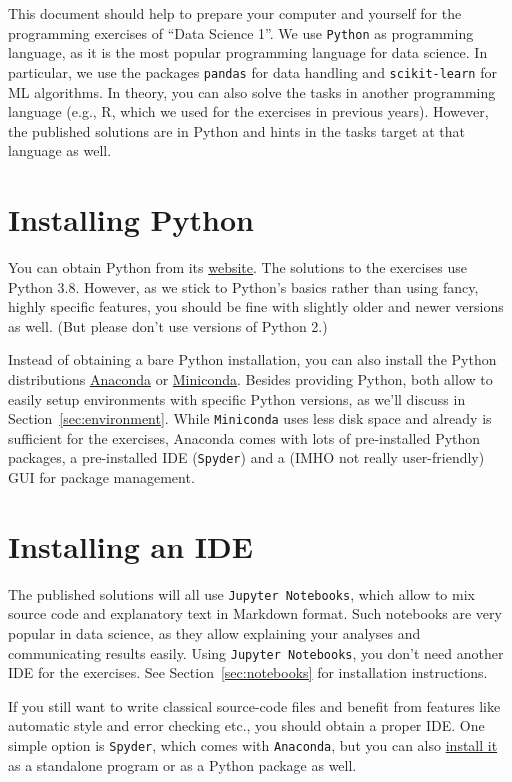 \documentclass[12pt]{article}
\newcommand{\code}[1]{{\color{kitgreen}\texttt{#1}}}
\begin{document}
\noindent
This document should help to prepare your computer and yourself for the programming exercises of ``Data Science 1''.
We use \code{Python} as programming language, as it is the most popular programming language for data science.
In particular, we use the packages \code{pandas} for data handling and \code{scikit-learn} for ML algorithms.
In theory, you can also solve the tasks in another programming language (e.g., R, which we used for the exercises in previous years).
However, the published solutions are in Python and hints in the tasks target at that language as well.

\section{Installing Python}

You can obtain Python from its \href{https://www.python.org/downloads/}{website}.
The solutions to the exercises use Python 3.8.
However, as we stick to Python's basics rather than using fancy, highly specific features, you should be fine with slightly older and newer versions as well.
(But please don't use versions of Python 2.)

Instead of obtaining a bare Python installation, you can also install the Python distributions \href{https://www.anaconda.com/products/individual}{Anaconda} or \href{https://docs.conda.io/en/latest/miniconda.html}{Miniconda}.
Besides providing Python, both allow to easily setup environments with specific Python versions, as we'll discuss in Section~\ref{sec:environment}.
While \code{Miniconda} uses less disk space and already is sufficient for the exercises, Anaconda comes with lots of pre-installed Python packages, a pre-installed IDE (\code{Spyder}) and a (IMHO not really user-friendly) GUI for package management.

\section{Installing an IDE}

The published solutions will all use \code{Jupyter Notebooks}, which allow to mix source code and explanatory text in Markdown format.
Such notebooks are very popular in data science, as they allow explaining your analyses and communicating results easily.
Using \code{Jupyter Notebooks}, you don't need another IDE for the exercises.
See Section~\ref{sec:notebooks} for installation instructions.

If you still want to write classical source-code files and benefit from features like automatic style and error checking etc., you should obtain a proper IDE.
One simple option is \code{Spyder}, which comes with \code{Anaconda}, but you can also \href{https://docs.spyder-ide.org/current/installation.html}{install it} as a standalone program or as a Python package as well.
\end{document}

